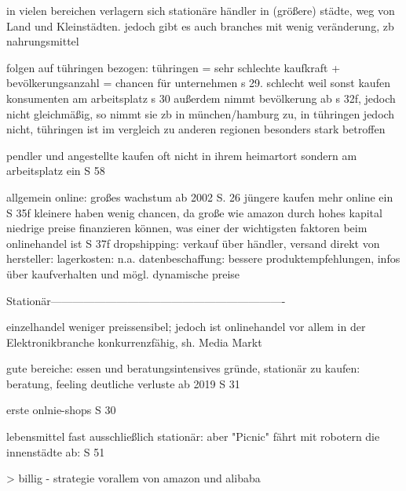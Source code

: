         in vielen bereichen verlagern sich stationäre händler in (größere) städte, weg von Land und Kleinstädten. jedoch gibt es auch branches mit wenig veränderung, zb nahrungsmittel
    
        folgen auf tühringen bezogen:
        tühringen = sehr schlechte kaufkraft + bevölkerungsanzahl = chancen für unternehmen s 29. schlecht weil sonst kaufen konsumenten am arbeitsplatz s 30
        außerdem nimmt bevölkerung ab s 32f, jedoch nicht gleichmäßig, so nimmt sie zb in münchen/hamburg zu, in tühringen jedoch nicht, tühringen ist im vergleich zu anderen regionen besonders stark betroffen
        
        
        pendler und angestellte kaufen oft nicht in ihrem heimartort sondern am arbeitsplatz ein S 58
    
    
    
    
    
    
        
        allgemein online: großes wachstum ab 2002 S. 26
            jüngere kaufen mehr online ein S 35f
            kleinere haben wenig chancen, da große wie amazon durch hohes kapital niedrige preise finanzieren können, was einer der wichtigsten faktoren beim onlinehandel ist S 37f
            dropshipping: verkauf über händler, versand direkt von hersteller: lagerkosten: n.a.
            datenbeschaffung: bessere produktempfehlungen, infos über kaufverhalten und mögl. dynamische preise
            
    
        
        Stationär----------------------------------------------------------------


            einzelhandel weniger preissensibel; jedoch ist onlinehandel vor allem in der Elektronikbranche konkurrenzfähig, sh. Media Markt\cite[S. 21f]{Graf}

        gute bereiche: essen und beratungsintensives
        gründe, stationär zu kaufen: beratung, feeling
            deutliche verluste ab 2019 S 31
            
            erste onlnie-shops S 30
            
            lebensmittel fast ausschließlich stationär: aber "Picnic" fährt mit robotern die innenstädte ab: S 51


            
\fi








\iffalse
> billig - strategie vorallem von amazon und alibaba

